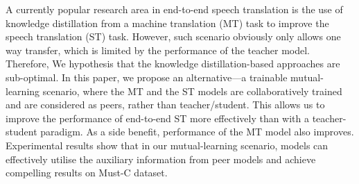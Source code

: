 A currently popular research area in end-to-end speech translation is the use of knowledge distillation from a machine translation (MT) task to improve the speech translation (ST) task. However, such scenario obviously only allows one way transfer, which is limited by the performance of the teacher model. Therefore, We hypothesis that the knowledge distillation-based approaches are sub-optimal. In this paper, we propose an alternative---a trainable mutual-learning scenario, where the MT and the ST models are collaboratively trained and are considered as peers, rather than teacher/student. This allows us to improve the performance of end-to-end ST more effectively than with a teacher-student paradigm. As a side benefit, performance of the MT model also improves. Experimental results show that in our mutual-learning scenario, models can effectively utilise the auxiliary information from peer models and achieve compelling results on Must-C dataset.
